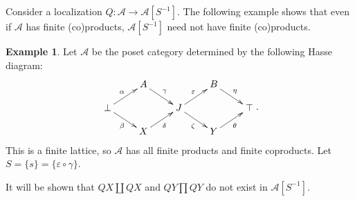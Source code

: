 \documentclass[10pt,a4paper]{amsart}
\theoremstyle{plain}
\theoremstyle{definition}
\newtheorem{example}[theorem]{Example}
\theoremstyle{remark}
\begin{document}
Consider a localization $Q:\mathcal A\longrightarrow\mathcal A[S^{-1}]$.
The following example shows that even if $\mathcal{A}$ has finite (co)products, $\mathcal{A}[S^{-1}]$ need not have finite (co)products.

\begin{example}\label{ex_seven_element_lattice}
  Let $\mathcal A$ be the poset category determined by the following Hasse diagram:
  \[
    \vcenter{\hbox{$\xymatrix@C=8mm@R=4mm{
      &A\ar[dr]^{\gamma}&&B\ar[dr]^{\eta}&\\
      \bot\ar[ur]^{\alpha}\ar[dr]_{\beta}&&
      J\ar[ur]^{\varepsilon}\ar[dr]_{\zeta}&&\top\\
      &X\ar[ur]_{\delta}&&Y\ar[ur]_{\theta}&
      }$}}.
  \]
  This is a finite lattice, so $\mathcal A$ has all finite products and finite coproducts.
  Let $S=\{s\} = \{\varepsilon\circ\gamma\}$.

  \medskip

  It will be shown that $QX \coprod QX$ and $QY \prod QY$ do not exist in $\mathcal A[S^{-1}]$.
\end{example}
\end{document}
